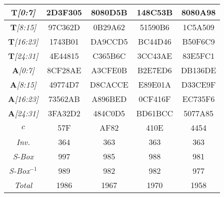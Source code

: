 \begin{sidewaystable}
\begin{center}
\begin{tabular}{|c||c|c|c|c|}
\emph{$\mathbf{T}$[0:7]} & 2D3F305 &  8080D5B &  148C53B &  8080A98   \\ \hline
\emph{$\mathbf{T}$[8:15]} & 97C362D &  0B29A62 &  51590B6 &  1C5A509   \\ \hline
\emph{$\mathbf{T}$[16:23]} & 1743B01 &  DA9CCD5 &  BC44D46 &  B50F6C9   \\ \hline
\emph{$\mathbf{T}$[24:31]} & 4E44815 &  C365B6C &  3CC43AE &  83E5FC1   \\ \hline
\emph{$\mathbf{A}$[0:7]} & 8CF28AE &  A3CFE0B &  B2E7ED6 &  DB136DE   \\ \hline
\emph{$\mathbf{A}$[8:15]} & 49774D7 &  D8CACCE &  E89E01A &  D33CE9F   \\ \hline
\emph{$\mathbf{A}$[16:23]} & 73562AB &  A896BED &  0CF416F &  EC735F6   \\ \hline
\emph{$\mathbf{A}$[24:31]} & 3FA32D2 &  484C0D5 &  BD61BCC &  5077A85   \\ \hline
\emph{$c$} & 57F &  AF82 &  410E &  4454   \\ \hline
\emph{Inv.} & 364 &  363 &  363 &  363   \\ \hline
\emph{S-Box} & 997 &  985 &  988 &  981   \\ \hline 
\emph{S-Box$^{-1}$} & 989 &  982 &  982 &  977  \\ \hline
\emph{Total} & 1986 &  1967 &  1970 &  1958   \\ \hline
    \end{tabular}
\end{center}
\end{sidewaystable}


